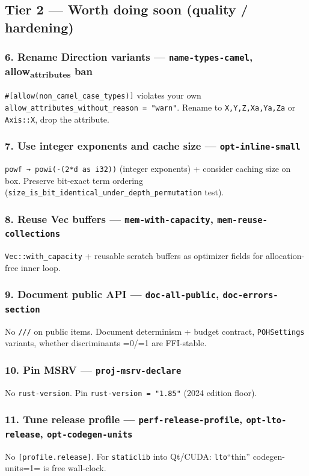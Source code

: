 \documentclass[11pt]{article}
\begin{document}
\subsection{Tier 2 — Worth doing soon (quality / hardening)}
\label{sec:orgb5f4667}

\subsubsection{6. Rename Direction variants — \texttt{name-types-camel}, allow\textsubscript{attributes} ban}
\label{sec:org51028b9}
\texttt{\#[allow(non\_camel\_case\_types)]} violates your own \texttt{allow\_attributes\_without\_reason = "warn"}. Rename to \texttt{X,Y,Z,Xa,Ya,Za} or \texttt{Axis::X}, drop the attribute.
\subsubsection{7. Use integer exponents and cache size — \texttt{opt-inline-small}}
\label{sec:org2035f24}
\texttt{powf → powi(-(2*d as i32))} (integer exponents) + consider caching size on box. Preserve bit-exact term ordering (\texttt{size\_is\_bit\_identical\_under\_depth\_permutation} test).
\subsubsection{8. Reuse Vec buffers — \texttt{mem-with-capacity}, \texttt{mem-reuse-collections}}
\label{sec:org8a29744}
\texttt{Vec::with\_capacity} + reusable scratch buffers as optimizer fields for allocation-free inner loop.
\subsubsection{9. Document public API — \texttt{doc-all-public}, \texttt{doc-errors-section}}
\label{sec:org4e9e4ad}
No \texttt{///} on public items. Document determinism + budget contract, \texttt{POHSettings} variants, whether discriminants =0/=1 are FFI-stable.
\subsubsection{10. Pin MSRV — \texttt{proj-msrv-declare}}
\label{sec:orgd43efbf}
No \texttt{rust-version}. Pin \texttt{rust-version = "1.85"} (2024 edition floor).
\subsubsection{11. Tune release profile — \texttt{perf-release-profile}, \texttt{opt-lto-release}, \texttt{opt-codegen-units}}
\label{sec:org795e710}
No \texttt{[profile.release]}. For \texttt{staticlib} into Qt/CUDA: \texttt{lto}``thin'' codegen-units=1= is free wall-clock.
\end{document}
